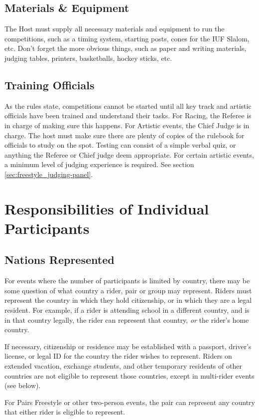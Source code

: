 \section{Materials \& Equipment}
The Host must supply all necessary materials and equipment to run the competitions, such as a timing system, starting posts, cones for the IUF Slalom, etc.
Don't forget the more obvious things, such as paper and writing materials, judging tables, printers, basketballs, hockey sticks, etc.

\section{Training Officials}
As the rules state, competitions cannot be started until all key track and artistic officials have been trained and understand their tasks.
For Racing, the Referee is in charge of making sure this happens.
For Artistic events, the Chief Judge is in charge.
The host must make sure there are plenty of copies of the rulebook for officials to study on the spot.
Testing can consist of a simple verbal quiz, or anything the Referee or Chief judge deem appropriate.
For certain artistic events, a minimum level of judging experience is required.
See section \ref{sec:freestyle_judging-panel}.

\chapter{Responsibilities of Individual Participants}
\section{Nations Represented}
For events where the number of participants is limited by country, there may be some question of what country a rider, pair or group may represent.
Riders must represent the country in which they hold citizenship, or in which they are a legal resident.
For example, if a rider is attending school in a different country, and is in that country legally, the rider can represent that country, \textit{or} the rider's home country.

If necessary, citizenship or residence may be established with a passport, driver's license, or legal ID for the country the rider wishes to represent.
Riders on extended vacation, exchange students, and other temporary residents of other countries are not eligible to represent those countries, except in multi-rider events (see below).

For Pairs Freestyle or other two-person events, the pair can represent any country that either rider is eligible to represent.

